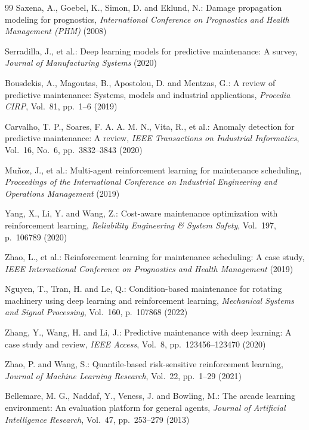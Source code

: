\documentclass[twocolumn]{article}
\begin{document}
\begin{thebibliography}{99}
Saxena, A., Goebel, K., Simon, D. and Eklund, N.:
Damage propagation modeling for prognostics,
{\em International Conference on Prognostics and Health Management (PHM)} (2008)

Serradilla, J., et al.:
Deep learning models for predictive maintenance: A survey,
{\em Journal of Manufacturing Systems} (2020)

Bousdekis, A., Magoutas, B., Apostolou, D. and Mentzas, G.:
A review of predictive maintenance: Systems, models and industrial applications,
{\em Procedia CIRP}, Vol.~81, pp.~1--6 (2019)

Carvalho, T. P., Soares, F. A. A. M. N., Vita, R., et al.:
Anomaly detection for predictive maintenance: A review,
{\em IEEE Transactions on Industrial Informatics}, Vol.~16, No.~6, pp.~3832--3843 (2020)

Muñoz, J., et al.:
Multi-agent reinforcement learning for maintenance scheduling,
{\em Proceedings of the International Conference on Industrial Engineering and Operations Management} (2019)

Yang, X., Li, Y. and Wang, Z.:
Cost-aware maintenance optimization with reinforcement learning,
{\em Reliability Engineering \& System Safety}, Vol.~197, p.~106789 (2020)

Zhao, L., et al.:
Reinforcement learning for maintenance scheduling: A case study,
{\em IEEE International Conference on Prognostics and Health Management} (2019)

Nguyen, T., Tran, H. and Le, Q.:
Condition-based maintenance for rotating machinery using deep learning and reinforcement learning,
{\em Mechanical Systems and Signal Processing}, Vol.~160, p.~107868 (2022)

Zhang, Y., Wang, H. and Li, J.:
Predictive maintenance with deep learning: A case study and review,
{\em IEEE Access}, Vol.~8, pp.~123456--123470 (2020)

Zhao, P. and Wang, S.:
Quantile-based risk-sensitive reinforcement learning,
{\em Journal of Machine Learning Research}, Vol.~22, pp.~1--29 (2021)

Bellemare, M. G., Naddaf, Y., Veness, J. and Bowling, M.:
The arcade learning environment: An evaluation platform for general agents,
{\em Journal of Artificial Intelligence Research}, Vol.~47, pp.~253--279 (2013)


\end{thebibliography}
\end{document}
